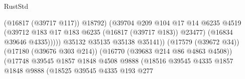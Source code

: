 \begin{lexlean}{RustStd}
\begin{coremodule}
{\begin{coremodule}
{{{{{{{{{{{{{{{{{{{{{{{{{{{{{{{{{{{{{{{{{{{{{{{{{{{{{{{                                                            (@16817 (@39717 @117))
                                                            @18792)
                                                          (@39704
                                                            @209
                                                            @104
                                                            @17
                                                            @14
                                                            @6235
                                                            @4519
                                                            (@39712
                                                              @183
                                                              @17
                                                              @183
                                                              @6235
                                                              (@16817 (@39717 @183))
                                                              @23477)
                                                            (@16834 @39646 @4335)))))
                                                    @35132
                                                    @35135
                                                    @35138
                                                    @35141))
                                                (@17579 (@39672 @34))
                                                (@17180 (@39676 @303 @214))
                                                (@16770 (@39683 @214 @86 @4863 @4508))
                                                (@17748
                                                  @39545
                                                  @1857
                                                  @1848
                                                  @4508
                                                  @9888
                                                  (@18516
                                                    @39545
                                                    @4335
                                                    @1857
                                                    @1848
                                                    @9888
                                                    (@18525
                                                      @39545
                                                      @4335
                                                      @193
                                                      @277
}}}}}}}}}}}}}}}}}}}}}}}}}}}}}}}}}}}}}}}}}}}}}}}}}}}}}}}
\end{coremodule}}
\end{coremodule}
\end{lexlean}
